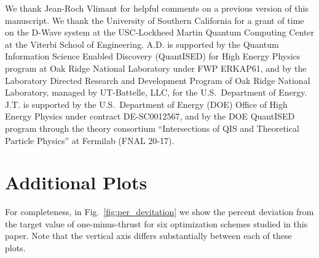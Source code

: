 \documentclass[aps,prd,twocolumn,superscriptaddress,preprintnumbers,nofootinbib,longbibliography,floatfix]{revtex4-1}
\DeclareRobustCommand{\Fig}[1]{Fig.~\ref{fig:#1}}
\begin{document}
\begin{acknowledgments}

We thank Jean-Roch Vlimant for helpful comments on a previous version of this manuscript.
%
We thank the University of Southern California for a grant of time on the D-Wave system at the USC-Lockheed Martin Quantum Computing Center at the Viterbi School of Engineering.
%
A.D. is supported by the Quantum Information Science Enabled Discovery (QuantISED) for High Energy Physics program at Oak Ridge National Laboratory under FWP ERKAP61, and by the Laboratory Directed Research and Development Program of Oak Ridge National Laboratory, managed by UT-Battelle, LLC, for the U.S.\ Department of Energy.
%
J.T. is supported by the U.S.\ Department of Energy (DOE) Office of High Energy Physics under contract DE-SC0012567, and by the DOE QuantISED program through the theory consortium ``Intersections of QIS and Theoretical Particle Physics'' at Fermilab (FNAL 20-17).

\end{acknowledgments}



\appendix
\section{Additional Plots}

For completeness, in \Fig{per_devitation} we show the percent deviation from the target value of one-minus-thrust for six optimization schemes studied in this paper.
%
Note that the vertical axis differs substantially between each of these plots.

\begin{figure*}[p]
\centering
{}\\
%
%
\\
%
\\
%
\caption{Percent deviation from the target value of one-minus-thrust, as a function of number of particles. 
%
The box plots represent the median as a solid black line for each bin, as well as the first and third quartiles. Outlier points are displayed as black diamonds.
%
Results from the Advantage QPU with default settings are shown for (a) forward annealing (repeated from \Fig{dwavedef} for convenience), (b) the SPVAR algorithm, and (c) reverse annealing.
%
Continued on next page.
}
\label{fig:per_devitation}
\end{figure*}
\end{document}
